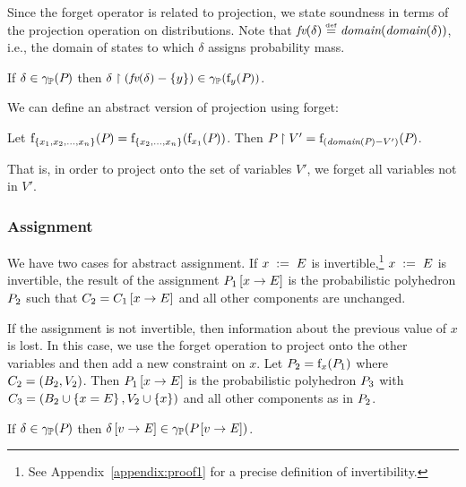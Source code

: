 Since the forget operator is related to projection, we state soundness
in terms of the projection operation on distributions.  Note that
$\textit{fv}(\delta) \stackrel{\smash{\scriptscriptstyle \mathrm{def}}}= \textit{domain}(\textit{domain}(\delta))$, i.e., the domain of 
states to which $\delta$ assigns probability mass.
\begin{lemma}
\label{lem:pp:forget}
If $\delta \in \gamma_{\mathbb{P}}(P_{})$ then $\delta \upharpoonright (\textit{fv}(\delta) - \{y\}) \in \gamma_{\mathbb{P}}(\mathrm{f}_{y}(P_{}))$.
\end{lemma}
\noindent
We can define an abstract version of projection using forget:
\begin{definition}
Let $\mathrm{f}_{\{x_1,x_2,\ldots,x_n\}}(P_{}) =
\mathrm{f}_{\{x_2,\ldots,x_n\}}(\mathrm{f}_{x_1}(P_{}))$.  Then
$P_{} \upharpoonright V' = \mathrm{f}_{(\textit{domain}(P_{}) - V')}(P_{})$. 
\end{definition}
That is, in order to project onto the set of variables $V'$, we forget all variables not in $V'$.

\subsubsection{Assignment}

We have two cases for abstract assignment.  If 
\iffull
${x}\;:=\;{E}$ is invertible,\footnote{See Appendix~\ref{appendix:proof1} for a
  precise definition of invertibility.}
\else
${x}\;:=\;{E}$ is invertible,
\fi
the
 result of the assignment $P_{1} \left[ x \rightarrow E \right]$ is the
probabilistic polyhedron $P_{2}$ such that
$C_{2} = C_{1} \left[ x \rightarrow E \right]$ and all other
components are unchanged.

If the assignment is not invertible, then information about
the previous value of $x$ is lost.  In this case, we use the forget
operation to project onto the other variables and then add a new
constraint on $x$.  Let $P_{2} = \mathrm{f}_{x}(P_{1})$
where $C_2 = (B_2, V_2)$.  Then $P_{1}
\left[ x \rightarrow E \right]$ is the probabilistic polyhedron $P_{3}$ with 
$ C_3 = (B_2 \cup \left\{ x = E \right\}, V_2 \cup \left\{ x \right\})$ and all
other components as in $P_{2}$.

\begin{lemma}
\label{lem:pp:assign}
If $\delta \in \gamma_{\mathbb{P}}(P_{})$ then $\delta \left[ v \rightarrow \mathit{E} \right] \in \gamma_{\mathbb{P}}(P_{} \left[ v \rightarrow \mathit{E} \right])$.
\end{lemma}

